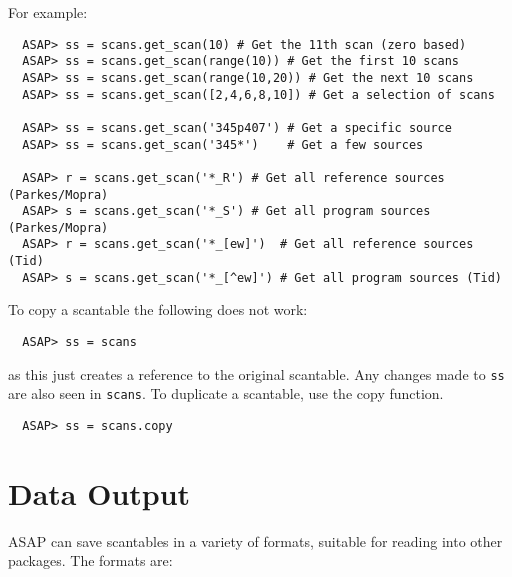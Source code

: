 \documentclass[11pt]{article}
\newcommand{\cmd}[1]{{\tt #1}}
\begin{document}
For example:

\begin{verbatim}
  ASAP> ss = scans.get_scan(10) # Get the 11th scan (zero based)
  ASAP> ss = scans.get_scan(range(10)) # Get the first 10 scans
  ASAP> ss = scans.get_scan(range(10,20)) # Get the next 10 scans
  ASAP> ss = scans.get_scan([2,4,6,8,10]) # Get a selection of scans

  ASAP> ss = scans.get_scan('345p407') # Get a specific source
  ASAP> ss = scans.get_scan('345*')    # Get a few sources

  ASAP> r = scans.get_scan('*_R') # Get all reference sources (Parkes/Mopra)
  ASAP> s = scans.get_scan('*_S') # Get all program sources (Parkes/Mopra)
  ASAP> r = scans.get_scan('*_[ew]')  # Get all reference sources (Tid)
  ASAP> s = scans.get_scan('*_[^ew]') # Get all program sources (Tid)

\end{verbatim}

To copy a scantable the following does not work:

\begin{verbatim}
  ASAP> ss = scans
\end{verbatim}

as this just creates a reference to the original scantable. Any
changes made to \cmd{ss} are also seen in \cmd{scans}. To duplicate a
scantable, use the copy function.

\begin{verbatim}
  ASAP> ss = scans.copy
\end{verbatim}

\section{Data Output}

ASAP can save scantables in a variety of formats, suitable for reading
into other packages. The formats are:
\end{document}
